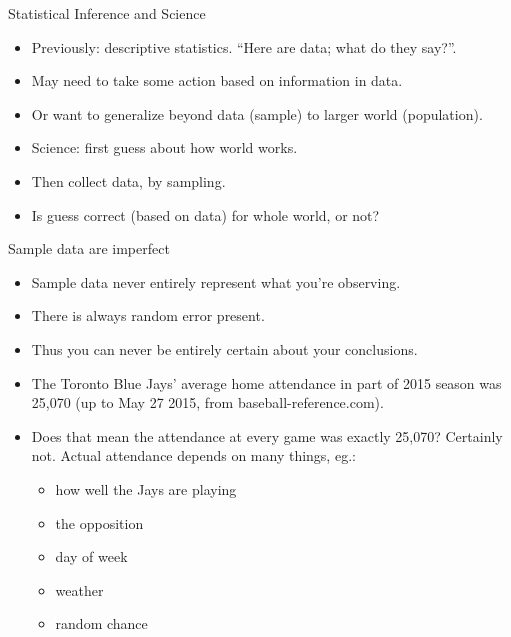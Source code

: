\documentclass[ignorenonframetext,]{beamer}
\providecommand{\tightlist}{%
  \setlength{\itemsep}{0pt}\setlength{\parskip}{0pt}}
\begin{document}
\begin{frame}{Statistical Inference and Science}
\protect\hypertarget{statistical-inference-and-science}{}

\begin{itemize}
\tightlist
\item
  Previously: descriptive statistics. ``Here are data; what do they
  say?''.
\item
  May need to take some action based on information in data.
\item
  Or want to generalize beyond data (sample) to larger world
  (population).
\item
  Science: first guess about how world works.
\item
  Then collect data, by sampling.
\item
  Is guess correct (based on data) for whole world, or not?
\end{itemize}

\end{frame}

\begin{frame}{Sample data are imperfect}
\protect\hypertarget{sample-data-are-imperfect}{}

\begin{itemize}
\tightlist
\item
  Sample data never entirely represent what you're observing.
\item
  There is always random error present.
\item
  Thus you can never be entirely certain about your conclusions.
\item
  The Toronto Blue Jays' average home attendance in part of 2015 season
  was 25,070 (up to May 27 2015, from baseball-reference.com).
\item
  Does that mean the attendance at every game was exactly 25,070?
  Certainly not. Actual attendance depends on many things, eg.:

  \begin{itemize}
  \tightlist
  \item
    how well the Jays are playing
  \item
    the opposition
  \item
    day of week
  \item
    weather
  \item
    random chance
  \end{itemize}
\end{itemize}

\end{frame}
\end{document}
